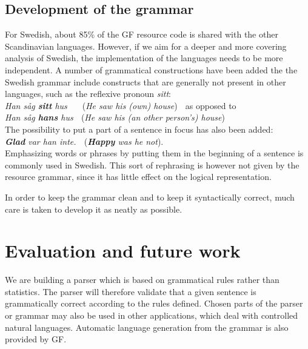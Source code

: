 \documentclass[submission]{eptcs} %
\begin{document}
\subsection{Development of the grammar}
For Swedish, about 85\% of the GF resource code is shared with the other Scandinavian
languages. %
However, if we aim for a deeper and more covering analysis of Swedish,
the implementation of the languages needs to be more independent.
A number of grammatical constructions have been added the the Swedish grammar
include constructs that are generally not present in other languages,
such as the reflexive pronoun \emph{sitt}: \\
\emph{Han såg \textbf{sitt} hus} $\; \; \; \;$ (\emph{He saw his (own) house}) $\;$
as opposed to \\
\emph{Han såg \textbf{hans} hus} $\;$ (\emph{He saw his (an other person's) house}) \\
The possibility to put a part of a sentence in focus has also been added:\\
\emph{\textbf{Glad} var han inte.} $\;$ (\emph{\textbf{Happy} was he not}). \\
Emphasizing words or phrases by putting them in the beginning of a sentence
is commonly used in Swedish.
This sort of rephrasing is however not given by the resource grammar, since it
has little effect on the logical representation.

In order to keep the grammar clean and to keep it syntactically correct,
much care is taken to develop it as neatly as possible. 

\section{Evaluation and future work}
We are building a parser which is based on grammatical rules rather than
statistics. The parser will therefore validate that
a given sentence is grammatically correct according to the rules defined.
Chosen parts of the parser or grammar may also be used in other applications,
which deal with controlled natural languages. Automatic language
generation from the grammar is also provided by GF.
\end{document}
